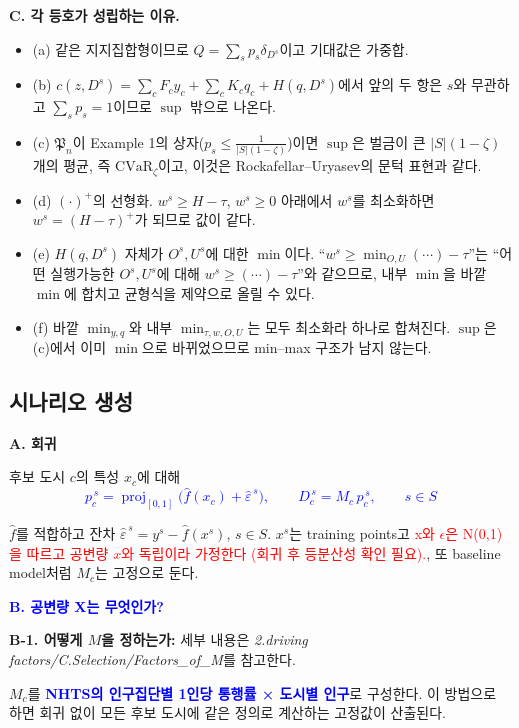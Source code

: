\documentclass[10pt,a4paper]{article}
\newcommand{\hd}[1]{\par\vspace{8pt}\textbf{#1}\par\vspace{3pt}}
\newcommand{\red}[1]{\textcolor{red}{#1}}
\begin{document}
\textbf{C. 각 등호가 성립하는 이유.}
\begin{itemize}[leftmargin=1.5em]
\item (a) 같은 지지집합형이므로 $Q=\sum_sp_s\delta_{D^s}$이고 기대값은 가중합.
\item (b) $c(z,D^s)=\sum_cF_cy_c+\sum_cK_cq_c+H(q,D^s)$에서 앞의 두 항은 $s$와 무관하고 $\sum_sp_s=1$이므로 $\sup$ 밖으로 나온다.
\item (c) $\mathfrak P_n$이 Example 1의 상자($p_s\le\frac1{|S|(1-\zeta)}$)이면 $\sup$은 벌금이 큰 $|S|(1-\zeta)$개의 평균, 즉 $\mathrm{CVaR}_\zeta$이고, 이것은 Rockafellar--Uryasev의 문턱 표현과 같다.
\item (d) $(\cdot)^+$의 선형화. $w^{s}\ge H-\tau$, $w^{s}\ge0$ 아래에서 $w^{s}$를 최소화하면 $w^{s}=(H-\tau)^+$가 되므로 값이 같다.
\item (e) $H(q,D^s)$ 자체가 $O^s,U^s$에 대한 $\min$이다. ``$w^{s}\ge\min_{O,U}(\cdots)-\tau$''는 ``어떤 실행가능한 $O^s,U^s$에 대해 $w^{s}\ge(\cdots)-\tau$''와 같으므로, 내부 $\min$을 바깥 $\min$에 합치고 균형식을 제약으로 올릴 수 있다.
\item (f) 바깥 $\min_{y,q}$와 내부 $\min_{\tau,w,O,U}$는 모두 최소화라 하나로 합쳐진다. $\sup$은 (c)에서 이미 $\min$으로 바뀌었으므로 min--max 구조가 남지 않는다.
\end{itemize}
\subsection{시나리오 생성}

\hd{A. 회귀}
후보 도시 $c$의 특성 $x_c$에 대해
\textcolor{blue}{\[
p_c^{\,s}=\operatorname{proj}_{[0,1]}\big(\hat f(x_c)+\hat\varepsilon^{\,s}\big),\qquad
D_c^{\,s}=M_c\,p_c^{\,s},\qquad s\in S
\]}

$\hat f$를 적합하고 잔차 $\hat\varepsilon^{\,s}=y^s-\hat f(x^s)$, $s\in S$. $x^s$는 training points고 \red{x와 $\epsilon$은 N(0,1)을 따르고 공변량 $x$와 독립이라 가정한다 (회귀 후 등분산성 확인 필요).}, 또 baseline model처럼 $M_c$는 고정으로 둔다.

\hd{\textcolor{blue}{B. 공변량 X는 무엇인가?}}

\item \textbf{B-1. 어떻게 $M$을 정하는가: }
세부 내용은 \textit{2.driving factors/C.Selection/Factors\_of\_M}를 참고한다.

$M_c$를 \textbf{\textcolor{blue}{NHTS의 인구집단별 1인당 통행률 × 도시별 인구}}로 구성한다. 이 방법으로 하면 회귀 없이 모든 후보 도시에 같은 정의로 계산하는 고정값이 산출된다.
\end{document}
